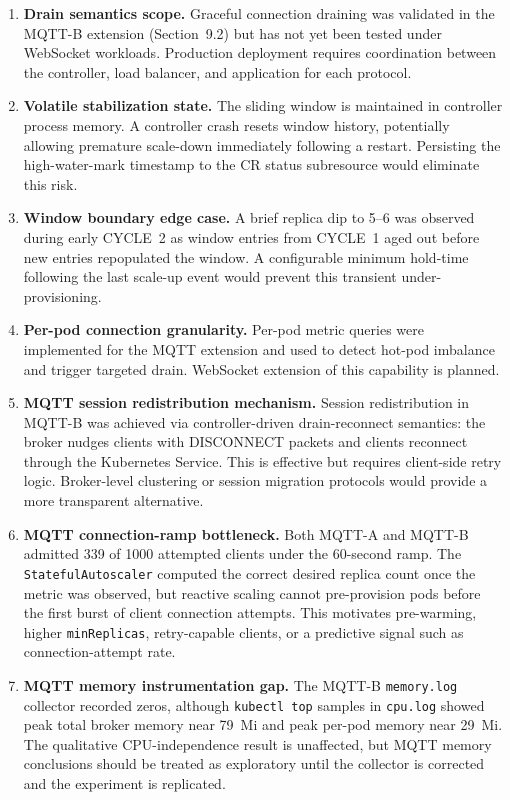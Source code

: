\documentclass[twocolumn]{svjour3}
\begin{document}
\begin{enumerate}[leftmargin=*]
\item \textbf{Drain semantics scope.} Graceful connection draining was validated in the MQTT-B extension (Section~9.2) but has not yet been tested under WebSocket workloads. Production deployment requires coordination between the controller, load balancer, and application for each protocol.

\item \textbf{Volatile stabilization state.} The sliding window is maintained in controller process memory. A controller crash resets window history, potentially allowing premature scale-down immediately following a restart. Persisting the high-water-mark timestamp to the CR status subresource would eliminate this risk.

\item \textbf{Window boundary edge case.} A brief replica dip to 5--6 was observed during early CYCLE~2 as window entries from CYCLE~1 aged out before new entries repopulated the window. A configurable minimum hold-time following the last scale-up event would prevent this transient under-provisioning.

\item \textbf{Per-pod connection granularity.} Per-pod metric queries were implemented for the MQTT extension and used to detect hot-pod imbalance and trigger targeted drain. WebSocket extension of this capability is planned.

\item \textbf{MQTT session redistribution mechanism.} Session redistribution in MQTT-B was achieved via controller-driven drain-reconnect semantics: the broker nudges clients with DISCONNECT packets and clients reconnect through the Kubernetes Service. This is effective but requires client-side retry logic. Broker-level clustering or session migration protocols would provide a more transparent alternative.

\item \textbf{MQTT connection-ramp bottleneck.} Both MQTT-A and MQTT-B admitted 339 of 1000 attempted clients under the 60-second ramp. The \texttt{StatefulAutoscaler} computed the correct desired replica count once the metric was observed, but reactive scaling cannot pre-provision pods before the first burst of client connection attempts. This motivates pre-warming, higher \texttt{minReplicas}, retry-capable clients, or a predictive signal such as connection-attempt rate.

\item \textbf{MQTT memory instrumentation gap.} The MQTT-B \texttt{memory.log} collector recorded zeros, although \texttt{kubectl top} samples in \texttt{cpu.log} showed peak total broker memory near 79~Mi and peak per-pod memory near 29~Mi. The qualitative CPU-independence result is unaffected, but MQTT memory conclusions should be treated as exploratory until the collector is corrected and the experiment is replicated.

\end{enumerate}
\end{document}
